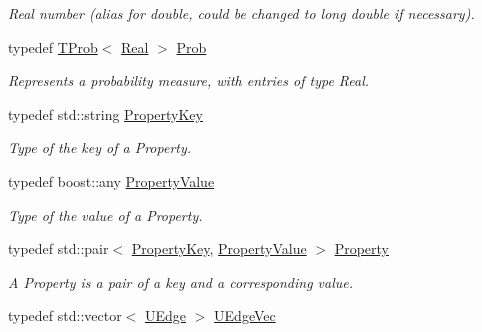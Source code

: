 \begin{CompactItemize}
\begin{CompactList}\small\item\em Real number (alias for double, could be changed to long double if necessary). \item\end{CompactList}\item 
\hypertarget{namespacedai_90f06137ef74bb483e30ee2c7e31b2c8}{
typedef \hyperlink{classdai_1_1TProb}{TProb}$<$ \hyperlink{namespacedai_e7d0472fdc89a8635825d01940e91cbf}{Real} $>$ \hyperlink{namespacedai_90f06137ef74bb483e30ee2c7e31b2c8}{Prob}}
\label{namespacedai_90f06137ef74bb483e30ee2c7e31b2c8}

\begin{CompactList}\small\item\em Represents a probability measure, with entries of type Real. \item\end{CompactList}\item 
\hypertarget{namespacedai_cc877a85f4f4dbb6a0d58c434bb2b996}{
typedef std::string \hyperlink{namespacedai_cc877a85f4f4dbb6a0d58c434bb2b996}{PropertyKey}}
\label{namespacedai_cc877a85f4f4dbb6a0d58c434bb2b996}

\begin{CompactList}\small\item\em Type of the key of a Property. \item\end{CompactList}\item 
\hypertarget{namespacedai_eb056b768d73d02c5796c4012f4170c7}{
typedef boost::any \hyperlink{namespacedai_eb056b768d73d02c5796c4012f4170c7}{PropertyValue}}
\label{namespacedai_eb056b768d73d02c5796c4012f4170c7}

\begin{CompactList}\small\item\em Type of the value of a Property. \item\end{CompactList}\item 
\hypertarget{namespacedai_cbc670414e04eecf5c284e42d9d036e3}{
typedef std::pair$<$ \hyperlink{namespacedai_cc877a85f4f4dbb6a0d58c434bb2b996}{PropertyKey}, \hyperlink{namespacedai_eb056b768d73d02c5796c4012f4170c7}{PropertyValue} $>$ \hyperlink{namespacedai_cbc670414e04eecf5c284e42d9d036e3}{Property}}
\label{namespacedai_cbc670414e04eecf5c284e42d9d036e3}

\begin{CompactList}\small\item\em A Property is a pair of a key and a corresponding value. \item\end{CompactList}\item 
\hypertarget{namespacedai_ee930c2594ad57112ff5e230c4ca3391}{
typedef std::vector$<$ \hyperlink{classdai_1_1UEdge}{UEdge} $>$ \hyperlink{namespacedai_ee930c2594ad57112ff5e230c4ca3391}{UEdgeVec}}
\label{namespacedai_ee930c2594ad57112ff5e230c4ca3391}


\end{CompactItemize}
